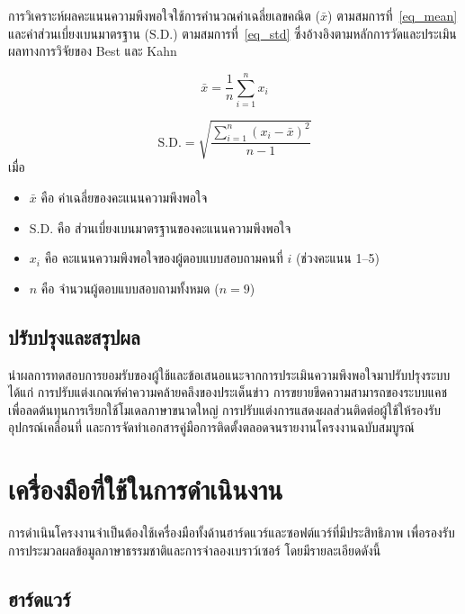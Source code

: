 การวิเคราะห์ผลคะแนนความพึงพอใจใช้การคำนวณค่าเฉลี่ยเลขคณิต ($\bar{x}$) ตามสมการที่~\eqref{eq_mean} และค่าส่วนเบี่ยงเบนมาตรฐาน ($\text{S.D.}$) ตามสมการที่~\eqref{eq_std} ซึ่งอ้างอิงตามหลักการวัดและประเมินผลทางการวิจัยของ Best และ Kahn~\parencite{best2006}

\begin{equation}
\label{eq_mean}
\bar{x} = \frac{1}{n} \sum_{i=1}^n x_i
\end{equation}

\begin{equation}
\label{eq_std}
\text{S.D.} = \sqrt{\frac{\sum_{i=1}^n (x_i - \bar{x})^2}{n - 1}}
\end{equation}
เมื่อ
\begin{itemize}[noitemsep,topsep=0pt]
    \item $\bar{x}$ คือ ค่าเฉลี่ยของคะแนนความพึงพอใจ
    \item $\text{S.D.}$ คือ ส่วนเบี่ยงเบนมาตรฐานของคะแนนความพึงพอใจ
    \item $x_i$ คือ คะแนนความพึงพอใจของผู้ตอบแบบสอบถามคนที่ $i$ (ช่วงคะแนน 1--5)
    \item $n$ คือ จำนวนผู้ตอบแบบสอบถามทั้งหมด ($n = 9$)
\end{itemize}

\subsection{ปรับปรุงและสรุปผล}

นำผลการทดสอบการยอมรับของผู้ใช้และข้อเสนอแนะจากการประเมินความพึงพอใจมาปรับปรุงระบบ ได้แก่ การปรับแต่งเกณฑ์ค่าความคล้ายคลึงของประเด็นข่าว การขยายขีดความสามารถของระบบแคชเพื่อลดต้นทุนการเรียกใช้โมเดลภาษาขนาดใหญ่ การปรับแต่งการแสดงผลส่วนติดต่อผู้ใช้ให้รองรับอุปกรณ์เคลื่อนที่ และการจัดทำเอกสารคู่มือการติดตั้งตลอดจนรายงานโครงงานฉบับสมบูรณ์

\section{เครื่องมือที่ใช้ในการดำเนินงาน}

การดำเนินโครงงานจำเป็นต้องใช้เครื่องมือทั้งด้านฮาร์ดแวร์และซอฟต์แวร์ที่มีประสิทธิภาพ เพื่อรองรับการประมวลผลข้อมูลภาษาธรรมชาติและการจำลองเบราว์เซอร์ โดยมีรายละเอียดดังนี้

\subsection{ฮาร์ดแวร์}

